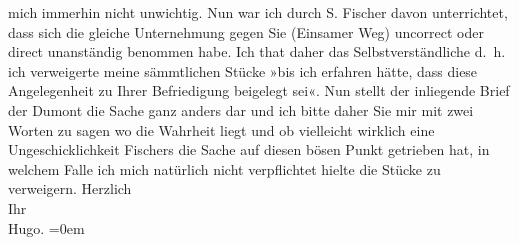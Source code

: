 \begin{ledgroupsized}[t]{13cm}
               mich immerhin nicht unwichtig. Nun war ich {\pb}durch S. Fischer davon unterrichtet, dass sich die gleiche
               Unternehmung gegen Sie (Einsamer Weg) uncorrect
               oder direct unanständig benommen habe. Ich that daher das Selbstverständliche d. h.
               ich verweigerte meine sämmtlichen Stücke »bis ich erfahren hätte, dass diese
               Angelegenheit zu Ihrer Befriedigung beigelegt sei«. Nun stellt der inliegende {\pb}Brief der Dumont die Sache ganz anders dar und ich bitte daher Sie mir
               mit zwei Worten zu sagen wo die Wahrheit liegt und ob vielleicht wirklich eine
               Ungeschicklichkeit Fischers die Sache auf diesen
               bösen Punkt getrieben hat, in welchem Falle ich mich natürlich nicht verpflichtet
               hielte die Stücke zu verweigern.\pend
           \pstart
           Herzlich{\\[\baselineskip]}Ihr{\\[\baselineskip]}\spacefill\mbox{Hugo.}\pend
           \leftskip=0em{}          \endnumbering{}\end{ledgroupsized}  \newcommand{\dateiname}{L01454}\newcommand{\titel}{Hugo von Hofmannsthal an Arthur Schnitzler, 14. 10. 1904}\newcommand{\editorInnen}{Martin Anton Müller und Gerd-Hermann Susen}
            \footnotesize
\begin{ledgroupsized}[t]{11.5cm}
\end{ledgroupsized}
         
      